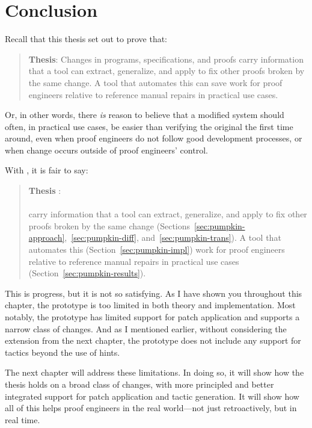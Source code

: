 \section{Conclusion}
\label{sec:pumpkin-concl}

Recall that this thesis set out to prove that:

\begin{quote}
\textbf{Thesis}: Changes in programs, specifications, and proofs carry information that a tool can extract, generalize, and apply to fix other proofs broken by the same change. A tool that automates this can save work for proof engineers relative to reference manual repairs in practical use cases.
\end{quote}
Or, in other words, there \textit{is} reason to believe that  a modified system should often, in practical use cases, be easier than verifying the original the first time around,
even when proof engineers do not follow good development processes,
or when change occurs outside of proof engineers' control.

With \sysname, it is fair to say:

\begin{quote}
\textbf{Thesis }:  \\
 \\
 carry information that a tool can extract, generalize, and  apply to fix other proofs broken by the same change (Sections~\ref{sec:pumpkin-approach},~\ref{sec:pumpkin-diff}, and~\ref{sec:pumpkin-trans}). A tool that automates this (Section~\ref{sec:pumpkin-impl})  work for proof engineers relative to reference manual repairs in  practical use cases (Section~\ref{sec:pumpkin-results}).
\end{quote}
This is progress, but it is not so satisfying.
As I have shown you throughout this chapter, the \sysname prototype is too limited in both theory and implementation.
Most notably, the \sysname prototype has limited support for patch application and supports
a narrow class of changes.
And as I mentioned earlier, without considering the extension from the next chapter, 
the \sysname prototype does not include any support for tactics beyond the use of hints.

The next chapter will address these limitations.
In doing so, it will show how the thesis holds on a broad class of changes,
with more principled and better integrated support for patch application and tactic generation.
It will show how all of this helps proof engineers in the real world---not just retroactively,
but in real time.





